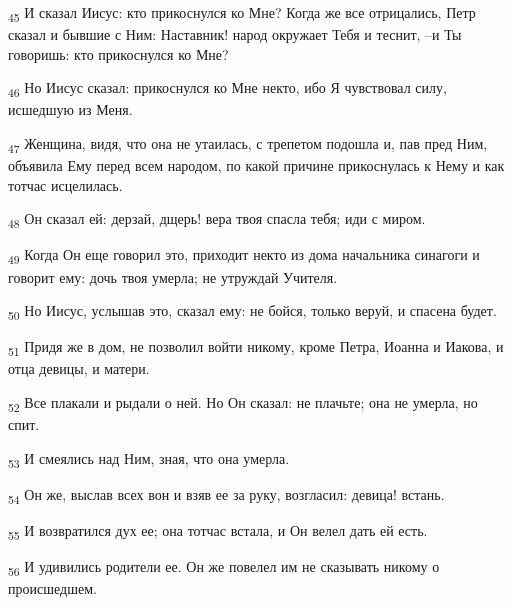 \begin{tcolorbox}
\textsubscript{45} И сказал Иисус: кто прикоснулся ко Мне? Когда же все отрицались, Петр сказал и бывшие с Ним: Наставник! народ окружает Тебя и теснит, --и Ты говоришь: кто прикоснулся ко Мне?
\end{tcolorbox}
\begin{tcolorbox}
\textsubscript{46} Но Иисус сказал: прикоснулся ко Мне некто, ибо Я чувствовал силу, исшедшую из Меня.
\end{tcolorbox}
\begin{tcolorbox}
\textsubscript{47} Женщина, видя, что она не утаилась, с трепетом подошла и, пав пред Ним, объявила Ему перед всем народом, по какой причине прикоснулась к Нему и как тотчас исцелилась.
\end{tcolorbox}
\begin{tcolorbox}
\textsubscript{48} Он сказал ей: дерзай, дщерь! вера твоя спасла тебя; иди с миром.
\end{tcolorbox}
\begin{tcolorbox}
\textsubscript{49} Когда Он еще говорил это, приходит некто из дома начальника синагоги и говорит ему: дочь твоя умерла; не утруждай Учителя.
\end{tcolorbox}
\begin{tcolorbox}
\textsubscript{50} Но Иисус, услышав это, сказал ему: не бойся, только веруй, и спасена будет.
\end{tcolorbox}
\begin{tcolorbox}
\textsubscript{51} Придя же в дом, не позволил войти никому, кроме Петра, Иоанна и Иакова, и отца девицы, и матери.
\end{tcolorbox}
\begin{tcolorbox}
\textsubscript{52} Все плакали и рыдали о ней. Но Он сказал: не плачьте; она не умерла, но спит.
\end{tcolorbox}
\begin{tcolorbox}
\textsubscript{53} И смеялись над Ним, зная, что она умерла.
\end{tcolorbox}
\begin{tcolorbox}
\textsubscript{54} Он же, выслав всех вон и взяв ее за руку, возгласил: девица! встань.
\end{tcolorbox}
\begin{tcolorbox}
\textsubscript{55} И возвратился дух ее; она тотчас встала, и Он велел дать ей есть.
\end{tcolorbox}
\begin{tcolorbox}
\textsubscript{56} И удивились родители ее. Он же повелел им не сказывать никому о происшедшем.
\end{tcolorbox}
